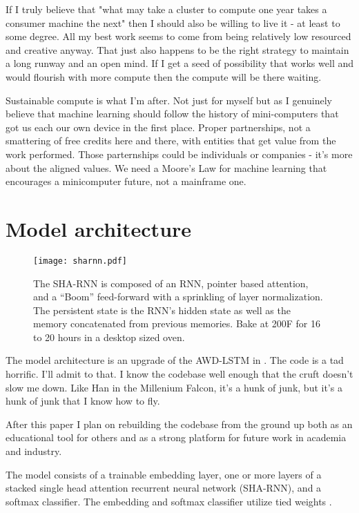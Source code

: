 \documentclass{article}
\begin{document}
If I truly believe that "what may take a cluster to compute one year takes a consumer machine the next" then I should also be willing to live it - at least to some degree.
All my best work seems to come from being relatively low resourced and creative anyway.
That just also happens to be the right strategy to maintain a long runway and an open mind.
If I get a seed of possibility that works well and would flourish with more compute then the compute will be there waiting.

Sustainable compute is what I'm after.
Not just for myself but as I genuinely believe that machine learning should follow the history of mini-computers that got us each our own device in the first place.
Proper partnerships, not a smattering of free credits here and there, with entities that get value from the work performed.
Those parternships could be individuals or companies - it's more about the aligned values.
We need a Moore's Law for machine learning that encourages a minicomputer future, not a mainframe one.

\section{Model architecture}

\begin{figure}[t]
 \centering 
 \texttt{[image: sharnn.pdf]}
\caption{The SHA-RNN is composed of an RNN, pointer based attention, and a ``Boom'' feed-forward with a sprinkling of layer normalization. The persistent state is the RNN's hidden state  as well as the memory  concatenated from previous memories.
Bake at 200F for 16 to 20 hours in a desktop sized oven.}
\label{fig:sharnn}
\end{figure}

The model architecture is an upgrade of the AWD-LSTM in \citet{merity2018regularizing}.
The code is a tad horrific.
I'll admit to that.
I know the codebase well enough that the cruft doesn't slow me down.
Like Han in the Millenium Falcon, it's a hunk of junk, but it's a hunk of junk that I know how to fly.

After this paper I plan on rebuilding the codebase from the ground up both as an educational tool for others and as a strong platform for future work in academia and industry.

The model consists of a trainable embedding layer, one or more layers of a stacked single head attention recurrent neural network (SHA-RNN), and a softmax classifier.
The embedding and softmax classifier utilize tied weights \cite{Inan2016,Press2016}.
\end{document}
